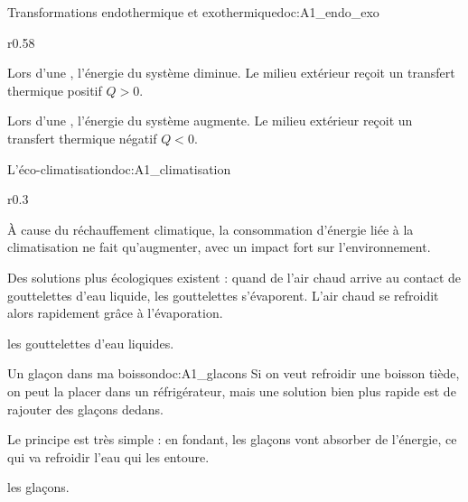 \begin{doc}{Transformations endothermique et exothermique}{doc:A1_endo_exo}
  \begin{wrapfigure}{r}{0.58\linewidth}
  \end{wrapfigure}
  \phantom{b}\vspace*{-20pt}
  
  \begin{encart}
    \begin{listePoints}
      \item Lors d'une , l'énergie du système diminue. 
      Le milieu extérieur reçoit un transfert thermique positif $Q > 0$.
      \item Lors d'une , l'énergie du système augmente.
      Le milieu extérieur reçoit un transfert thermique négatif $Q < 0$.
    \end{listePoints}
  \end{encart}
  
\end{doc}


\begin{doc}{L'éco-climatisation}{doc:A1_climatisation}
  \begin{wrapfigure}{r}{0.3\linewidth}
    \vspace*{-34pt}
    \centering
  \end{wrapfigure}
  À cause du réchauffement climatique, la consommation d'énergie liée à la climatisation ne fait qu'augmenter, avec un impact fort sur l'environnement.
  
  Des solutions plus écologiques existent : quand de l'air chaud arrive au contact de gouttelettes d'eau liquide, les gouttelettes s'évaporent.
  L'air chaud se refroidit alors rapidement grâce à l'évaporation.

   les gouttelettes d'eau liquides.
\end{doc}

\begin{doc}{Un glaçon dans ma boisson}{doc:A1_glacons}
  Si on veut refroidir une boisson tiède, on peut la placer dans un réfrigérateur, mais une solution bien plus rapide est de rajouter des glaçons dedans.
  
  Le principe est très simple : en fondant, les glaçons vont absorber de l'énergie, ce qui va refroidir l'eau qui les entoure.

   les glaçons.
\end{doc}

